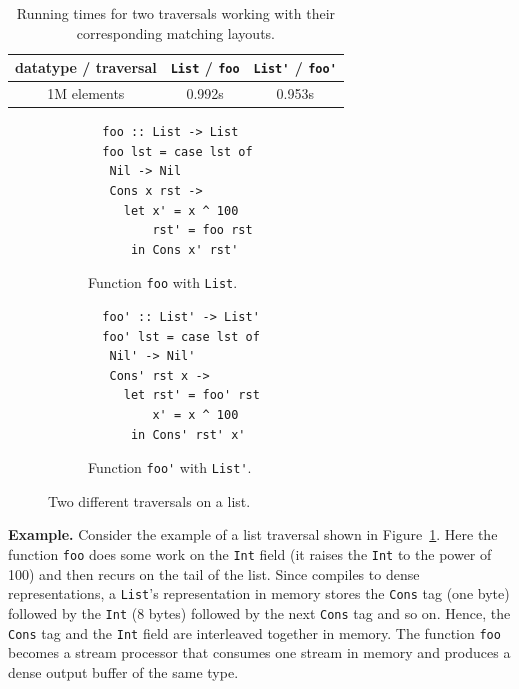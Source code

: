 \begin{table}[t]
    \centering
    \caption{Running times for two traversals working with their corresponding matching layouts.}
    \begin{tabular}{ccc}
    \toprule
    datatype / traversal & \lstinline|List| / \lstinline|foo| & \lstinline|List'| / \lstinline|foo'| \\
    \midrule
    {1M elements} & 0.992s & 0.953s \\
    \bottomrule
    \end{tabular}
    \label{table:list-power}
\end{table}

\begin{figure}[]
\centering
\begin{subfigure}{.5\textwidth}
    \centering
\begin{lstlisting}
  foo :: List -> List
  foo lst = case lst of
   Nil -> Nil
   Cons x rst ->
     let x' = x ^ 100
         rst' = foo rst
      in Cons x' rst'
\end{lstlisting}
\caption{Function \lstinline|foo| with \lstinline|List|.}
\label{fig:foo}
\end{subfigure}%
\begin{subfigure}{.5\textwidth}
    \centering
\begin{lstlisting}
  foo' :: List' -> List'
  foo' lst = case lst of
   Nil' -> Nil'
   Cons' rst x ->
     let rst' = foo' rst
         x' = x ^ 100
      in Cons' rst' x'
\end{lstlisting}
\caption{Function \lstinline|foo'| with \lstinline|List'|.}
\label{fig:foo'}
\end{subfigure}
\caption{Two different traversals on a list.}
\label{fig:two-diff-traversals}
\end{figure}

\textbf{Example.}
Consider the example of a list traversal shown in Figure~\ref{fig:foo}.
%
%
%
%
Here the function \lstinline|foo| does some work on the \lstinline|Int| field (it raises the \lstinline|Int| to the power of 100) and then recurs on the tail of the list.
%
Since \system compiles to dense representations, a \lstinline|List|'s representation
in memory stores the \lstinline|Cons| tag (one byte) followed by the \lstinline|Int| (8 bytes) followed by
the next \lstinline|Cons| tag and so on. Hence, the \lstinline|Cons| tag and the \lstinline|Int| field are interleaved together in memory.
%
The function \lstinline|foo| becomes a stream processor that consumes one stream in memory and produces a dense output buffer of the same type.

